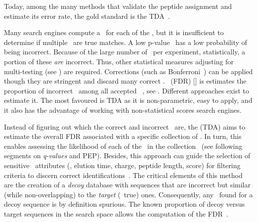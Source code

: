 
Today, among the many methods that validate the peptide assignment and
estimate its error rate,
the gold standard is the \gls{TDA}~.\mybr\

Many search engines compute a \pval\ for each of the \psms,
but it is insufficient to determine if multiple \psms\ are true matches.
A low p-value \psm\ has a low probability of being incorrect.
Because of the large number of \psms\ per experiment,
statistically, a portion of these \emph{are} incorrect.
Thus, other statistical measures
adjusting for multi-testing (see )
are required.
Corrections (such as Bonferroni~) can be applied
though they are stringent and discard many correct \psms.
~(\gls{FDR}) $[$\citet*{Benjamini1995-nf}$]$ is
estimates the proportion of incorrect \psms\
among all accepted \psms~,
see \Cref{eq:fdr-prot}.
Different approaches exist to estimate it.
The most favoured is \gls{TDA}
as it is non-parametric, easy to apply, and
it also has the advantage of working with non-statistical scores search engines.\mybr\

Instead of figuring out which the correct and incorrect \psms\ are,
the \glsentrydesc{TDA} (\gls{TDA}) aims to estimate
the overall \gls{FDR} associated with a specific collection of \psms.
In turn, this enables assessing the likelihood of each of the \psms\
in the collection~
(see following segments on \emph{q-values} and \gls{PEP}).
Besides, this approach can guide
the selection of sensitive \psm\ attributes
(\eg, elution time, charge, peptide length, score)
for filtering criteria to discern correct identifications~.
The critical elements of this method are
the creation of a \emph{decoy} database with sequences
that are incorrect but similar (while non-overlapping)
to the \emph{target} (\ie\ true) ones.
Consequently, any \psm\ found for a decoy sequence is by definition spurious.
The known proportion of decoy versus target sequences in the search space allows
the computation of the \gls{FDR}~\mycite{Elias2007-wi,Elias2010-kp}.\mybr\
\vspace{-9mm}


